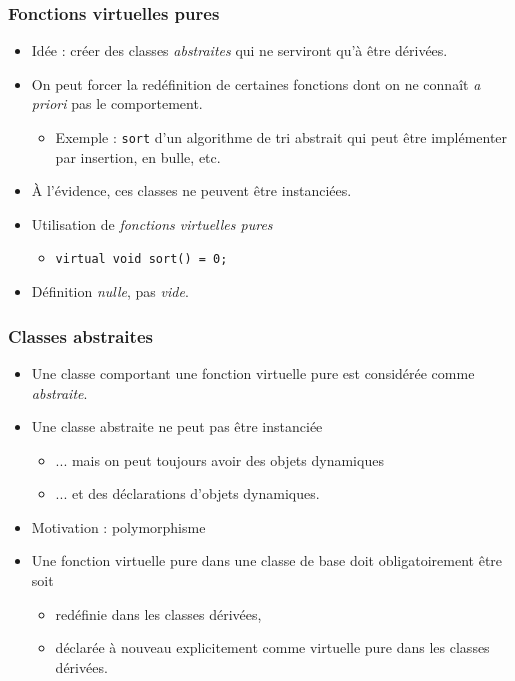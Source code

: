 \begin{frame}
\frametitle{Fonctions virtuelles pures}
\begin{itemize}[<+->]
\item Idée : créer des classes \emph{abstraites} qui ne serviront qu'à être dérivées.
\item On peut forcer la redéfinition de certaines fonctions dont on ne connaît \emph{a priori} pas le comportement.
	\begin{itemize}
	\item Exemple : \texttt{sort} d'un algorithme de tri abstrait qui peut être implémenter par insertion, en bulle, etc.
	\end{itemize}
\item À l'évidence, ces classes ne peuvent être instanciées.
\item Utilisation de \emph{fonctions virtuelles pures}
	\begin{itemize}
	\item \lstinline|virtual void sort() = 0;|
	\end{itemize}
\item Définition \emph{nulle}, pas \emph{vide}.
\end{itemize}
\end{frame}

\begin{frame}
\frametitle{Classes abstraites}
\begin{itemize}[<+->]
\item Une classe comportant une fonction virtuelle pure est considérée comme \emph{abstraite}.
\item Une classe abstraite ne peut pas être instanciée
	\begin{itemize}
	\item ... mais on peut toujours avoir des objets dynamiques
	\item ... et des déclarations d'objets dynamiques.
	\end{itemize}
\item Motivation : polymorphisme
\item Une fonction virtuelle pure dans une classe de base doit obligatoirement être soit
	\begin{itemize}
	\item redéfinie dans les classes dérivées,
	\item déclarée à nouveau explicitement comme virtuelle pure dans les classes dérivées.
	\end{itemize}
\end{itemize}
\end{frame}

